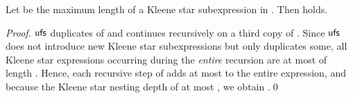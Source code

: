 \documentclass[envcountsame]{llncs}
\newcommand{\unfoldstep}{\ensuremath{{\sf ufs}}\xspace}
\begin{document}
\begin{proposition}
  \label{prop:unfold-step-size}
  Let  be the maximum length of a Kleene star subexpression in
  . 
Then  holds.
\end{proposition}

\begin{proof}
  \unfoldstep duplicates  of  and continues
  recursively on a third copy of .
Since \unfoldstep does not introduce new Kleene star subexpressions
  but only duplicates some, all Kleene star expressions occurring
  during the \emph{entire} recursion are at most of length .
Hence, each recursive step of  adds at most  to the
  entire expression, and because the Kleene star nesting depth of at
  most , we obtain .\qed
\end{proof}

\begin{proposition}[ runs in ]
  \label{prop:unfold-complexity}
\end{proposition}
\end{document}
